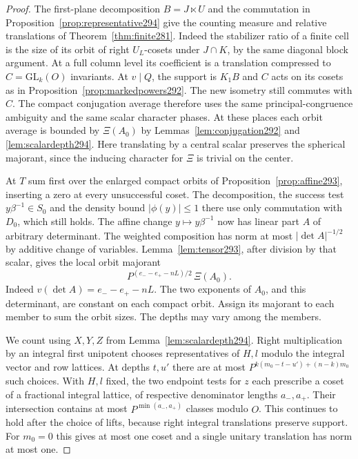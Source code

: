 \documentclass[a4paper,11pt]{article}
\theoremstyle{definition}
\theoremstyle{remark}
\numberwithin{equation}{section}
\begin{document}
\begin{proof}
The first-plane decomposition \(B=J\ltimes U\) and the
commutation in Proposition~\ref{prop:representative294}
give the counting measure and relative translations of
Theorem~\ref{thm:finite281}. Indeed the stabilizer ratio
of a finite cell is the size of its orbit of right
\(U_L\)-cosets under \(J\cap K\), by the same diagonal
block argument. At a full column level its coefficient
is a translation compressed to \(C=\mathrm{GL}_k(O)\)
invariants. At \(v\mid Q\), the support is \(K_1B\)
and \(C\) acts on its cosets as in
Proposition~\ref{prop:markedpowers292}. The new isometry
still commutes with \(C\). The compact conjugation average
therefore uses the same principal-congruence ambiguity
and the same scalar character phases. At these places
each orbit average is bounded by \(\Xi(A_0)\) by
Lemmas~\ref{lem:conjugation292} and \ref{lem:scalardepth294}.
Here translating by a central scalar preserves the
spherical majorant, since the inducing character for
\(\Xi\) is trivial on the center.

At \(T\) sum first over the enlarged compact orbits of
Proposition~\ref{prop:affine293}, inserting a zero at
every unsuccessful coset. The decomposition, the success
test \(y\beta^{-1}\in S_0\) and the density bound
\(|\phi(y)|\le1\) there use only commutation with \(D_0\),
which still holds. The affine change \(y\mapsto y\beta^{-1}\)
now has linear part \(A\) of arbitrary determinant.
The weighted composition has norm at most
\(|\det A|^{-1/2}\) by additive change of variables.
Lemma~\ref{lem:tensor293}, after division by that scalar,
gives the local orbit majorant
\[
      P^{(e_--e_+-n L)/2}\,\Xi(A_0).
\]
Indeed \(v(\det A)=e_--e_+-nL\). The two exponents of
\(A_0\), and this determinant, are constant on each compact
orbit. Assign its majorant to each member to sum the
orbit sizes. The depths may vary among the members.

We count using \(X,Y,Z\) from Lemma~\ref{lem:scalardepth294}.
Right multiplication by an integral first unipotent
chooses representatives of \(H,l\) modulo the integral
vector and row lattices. At depths \(t,u'\) there are at
most \(P^{k(m_0-t-u')+(n-k)m_0}\) such choices.
With \(H,l\) fixed, the two endpoint tests for \(z\)
each prescribe a coset of a fractional integral lattice,
of respective denominator lengths \(a_-,a_+\).
Their intersection contains at most \(P^{\min(a_-,a_+)}\)
classes modulo \(O\). This continues to hold after the
choice of lifts, because right integral translations
preserve support. For \(m_0=0\) this gives at most one
coset and a single unitary translation has norm at most
one.


\end{proof}
\end{document}
